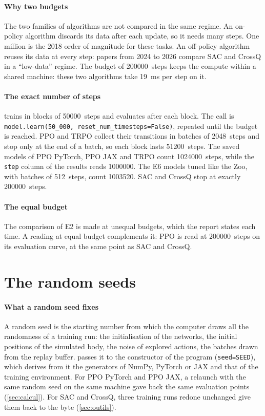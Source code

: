 \paragraph{Why two budgets}
The two families of algorithms are not compared in the same regime. An on-policy algorithm discards its data
after each update, so it needs many steps. One million is the 2018 order of magnitude for these tasks. An
off-policy algorithm reuses its data at every step: papers from 2024 to 2026 compare SAC and CrossQ in a
\enquote{low-data} regime. The budget of \num{200000}~steps keeps the compute within a shared machine:
these two algorithms take 19~ms per step on it.

\paragraph{The exact number of steps}
 trains in blocks of \num{50000}~steps and evaluates after each block. The call is
\texttt{model.learn(50\_000, reset\_num\_timesteps=False)}, repeated until the budget is reached. PPO and TRPO
collect their transitions in batches of \num{2048}~steps and stop only at the end of a batch, so each block
lasts \num{51200}~steps. The saved models of PPO PyTorch, PPO JAX and TRPO count \num{1024000}~steps, while
the \texttt{step} column of the results reads \num{1000000}. The E6 models tuned like the Zoo, with batches of
512~steps, count \num{1003520}. SAC and CrossQ stop at exactly \num{200000}~steps.

\paragraph{The equal budget}
The comparison of E2 is made at unequal budgets, which the report states each time. A reading at equal
budget complements it: PPO is read at \num{200000}~steps on its evaluation curve, at the same point as SAC and
CrossQ.

\section{The random seeds}\label{sec:graines}

\paragraph{What a random seed fixes}
A random seed is the starting number from which the computer draws all the randomness of a training run: the
initialisation of the networks, the initial positions of the simulated body, the noise of explored actions,
the batches drawn from the replay buffer.  passes it to the constructor of the program
(\texttt{seed=SEED}), which derives from it the generators of NumPy, PyTorch or JAX and that of the training
environment. For PPO PyTorch and PPO JAX, a relaunch with the same random seed on the same machine gave back
the same evaluation points (\cref{sec:calcul}). For SAC and CrossQ, three training runs redone unchanged give
them back to the byte (\cref{sec:outils}).

